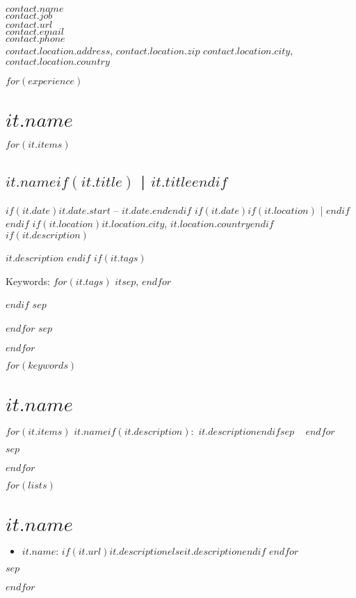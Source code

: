\documentclass[a4paper,11pt]{article}
\begin{document}
\noindent
{\LARGE\scshape $contact.name$}\\
$contact.job$ \\
\href{$contact.url$}{$contact.url$} \\
\href{mailto:$contact.email$}{$contact.email$} \\
$contact.phone$ \\
$contact.location.address$, $contact.location.zip$ $contact.location.city$, $contact.location.country$


$for(experience)$
\section*{$it.name$}
$for(it.items)$
\subsection*{\href{$it.url$}{$it.name$}$if(it.title)$ | $it.title$$endif$}
$if(it.date)$$it.date.start$ -- $it.date.end$$endif$
$if(it.date)$$if(it.location)$ | $endif$$endif$
$if(it.location)$$it.location.city$, {\scshape $it.location.country$}$endif$
$if(it.description)$

$it.description$
$endif$
$if(it.tags)$

Keywords:
$for(it.tags)$
    \mbox{\bf\sffamily $it$}$sep$,
$endfor$

$endif$
$sep$

$endfor$
$sep$

$endfor$


$for(keywords)$
\section*{$it.name$}
\begin{sloppypar}
$for(it.items)$
    {\bf\sffamily $it.name$}$if(it.description)$:~$it.description$$endif$$sep$ ~ 
$endfor$

\end{sloppypar}
$sep$

$endfor$


$for(lists)$
\section*{$it.name$}
\begin{itemize}
$for(it.items)$
    \item {\bf\sffamily $it.name$}: $if(it.url)$\href{$it.url$}{$it.description$}$else$$it.description$$endif$
$endfor$
\end{itemize}
$sep$

$endfor$
\end{document}
